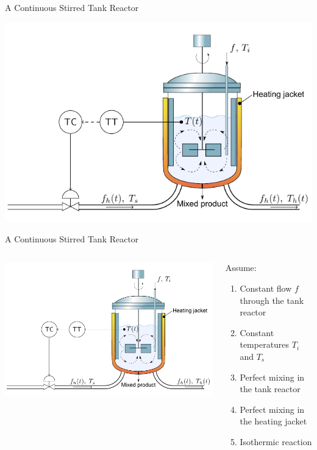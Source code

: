 \documentclass[presentation,aspectratio=169]{beamer}
\begin{document}
\begin{frame}[label={sec:org8673876}]{A Continuous Stirred Tank Reactor}
\begin{center}
\includegraphics[height=0.8\textheight]{../../figures/stirred_tank_heat_exchange}
\end{center}
\end{frame}

\begin{frame}[label={sec:org1afa60f}]{A Continuous Stirred Tank Reactor}
\begin{columns}
\begin{column}{0.6\columnwidth}
\begin{center}
\includegraphics[height=0.6\textheight]{../../figures/stirred_tank_heat_exchange}
\end{center}
\end{column}

\begin{column}{0.4\columnwidth}
Assume:
\begin{enumerate}
\item Constant flow \(f\) through the tank reactor
\item Constant temperatures \(T_i\) and \(T_s\)
\item Perfect mixing in the tank reactor
\item Perfect mixing in the heating jacket
\item Isothermic reaction
\end{enumerate}
\end{column}
\end{columns}
\end{frame}
\end{document}
